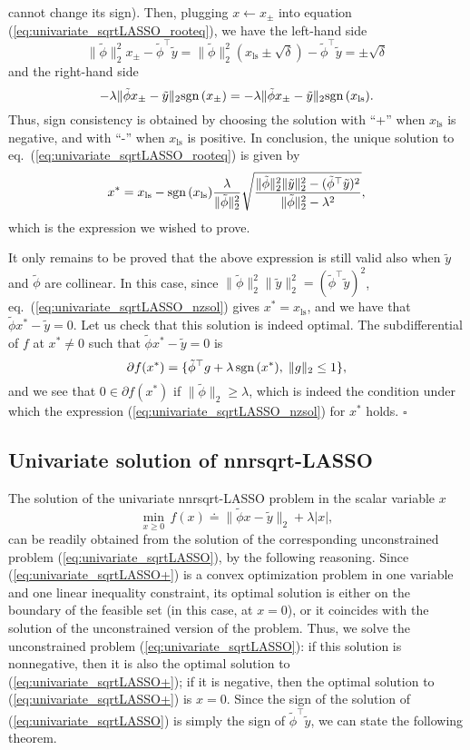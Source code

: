 \documentclass[11pt]{article}
\newcommand{\tran}{^{\top}}
\newcommand{\qed}{{\hfill $\square$}}
\newcommand{\lam}{\lambda}
\newcommand{\sign}{{\mbox{\rm sgn}\,}}
\newcommand{\beq}{\begin{equation}}
\newcommand{\eeq}{\end{equation}}
\newcommand{\ped}[1]{{_{\mathrm{#1}}}}
\begin{document}
cannot change its sign).
Then, plugging $x\gets x_\pm$ into equation (\ref{eq:univariate_sqrtLASSO_rooteq}), we have 
the left-hand side
\[
\|\tilde \phi\|_2^2 x_\pm  - \tilde \phi\tran \tilde y  = 
\|\tilde \phi\|_2^2 (x\ped{ls} \pm \sqrt{\delta}) - \tilde \phi\tran \tilde y =
\pm \sqrt{\delta}
\]
and the right-hand side
\[
-\lam  \|\tilde \phi x_\pm - \tilde y\|_2\sign(x_\pm) =
-\lam  \|\tilde \phi x_\pm - \tilde y\|_2\sign(x\ped{ls}).
\]
Thus, sign consistency is obtained by choosing the solution with ``+'' when $x\ped{ls}$ is negative, and
with ``-'' when $x\ped{ls}$ is positive. In conclusion, the unique solution to eq.\ (\ref{eq:univariate_sqrtLASSO_rooteq}) is given by
\[
x^* = x\ped{ls} -\sign (x\ped{ls}) \frac{\lam}{\|\tilde \phi\|_2^2}\sqrt{\frac{\|\tilde \phi\|_2^2\|\tilde y\|_2^2 - (\tilde \phi\tran \tilde y)^2}
{\|\tilde \phi\|_2^2-\lam^2 }},
\]
which is the expression we wished to prove.

It only remains to be proved that the above expression is still valid also when $\tilde y$ and $\tilde \phi$ are collinear.
In this case, since $\|\tilde \phi\|_2^2\|\tilde y\|_2^2  = (\tilde \phi\tran \tilde y)^2$, eq.\ (\ref{eq:univariate_sqrtLASSO_nzsol}) gives $x^* = x\ped{ls}$, and
we have that $\tilde \phi  x^* - \tilde y = 0$. Let us check that this solution is indeed optimal. The subdifferential of $f$
at $x^*\neq 0$ such that $\tilde \phi  x^* - \tilde y = 0$ is
\[
\partial f(x^*) = \{\tilde \phi\tran g + \lam \,\sign(x^*), \; \|g\|_2\leq 1\},
\]
and we see that $0\in \partial f(x^*) $ if $\|\tilde \phi\|_2 \geq \lam$, which is indeed the condition under which
the expression (\ref{eq:univariate_sqrtLASSO_nzsol}) for $x^*$ holds.
\qed


\subsection{Univariate solution of nnrsqrt-LASSO}
The solution of the univariate nnrsqrt-LASSO problem in the scalar variable $x$
\beq
\min_{x\geq 0}\,  f(x)\doteq
\|\tilde \phi x - \tilde y \|_2 +  \lam |x|,
\label{eq:univariate_sqrtLASSO+}
\eeq
can be readily obtained from the solution of the corresponding unconstrained problem (\ref{eq:univariate_sqrtLASSO}), by the following reasoning. Since (\ref{eq:univariate_sqrtLASSO+}) is a convex optimization problem in one variable and one linear inequality constraint, its optimal solution is either on the boundary of the feasible set (in this case, at $x=0$), or it coincides with the solution of the unconstrained version of the problem.
Thus, we solve the unconstrained problem  (\ref{eq:univariate_sqrtLASSO}): if this solution is nonnegative, then it is also the optimal solution to  (\ref{eq:univariate_sqrtLASSO+}); if it is negative, then the optimal solution to (\ref{eq:univariate_sqrtLASSO+}) is $x=0$. Since the sign of the solution of  (\ref{eq:univariate_sqrtLASSO}) is simply the sign of $\tilde \phi\tran \tilde y$, we can state the following theorem.
\end{document}
